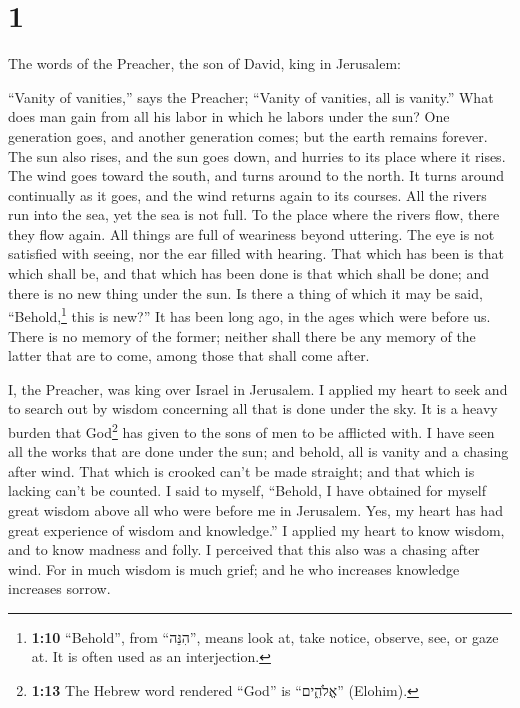\hypertarget{section}{%
\section{1}\label{section}}

 The words of the Preacher, the son of David, king in
Jerusalem:

 ``Vanity of vanities,'' says the Preacher; ``Vanity of
vanities, all is vanity.''  What does man gain from all
his labor in which he labors under the sun?  One
generation goes, and another generation comes; but the earth remains
forever.  The sun also rises, and the sun goes down, and
hurries to its place where it rises.  The wind goes toward
the south, and turns around to the north. It turns around continually as
it goes, and the wind returns again to its courses.  All
the rivers run into the sea, yet the sea is not full. To the place where
the rivers flow, there they flow again.  All things are
full of weariness beyond uttering. The eye is not satisfied with seeing,
nor the ear filled with hearing.  That which has been is
that which shall be, and that which has been done is that which shall be
done; and there is no new thing under the sun.  Is there
a thing of which it may be said, ``Behold,\footnote{\textbf{1:10}
  ``Behold'', from ``הִנֵּה'', means look at, take notice, observe, see,
  or gaze at. It is often used as an interjection.} this is new?'' It
has been long ago, in the ages which were before us. 
There is no memory of the former; neither shall there be any memory of
the latter that are to come, among those that shall come after.

 I, the Preacher, was king over Israel in Jerusalem.
 I applied my heart to seek and to search out by wisdom
concerning all that is done under the sky. It is a heavy burden that
God\footnote{\textbf{1:13} The Hebrew word rendered ``God'' is
  ``אֱלֹהִ֑ים'' (Elohim).} has given to the sons of men to be afflicted
with.  I have seen all the works that are done under the
sun; and behold, all is vanity and a chasing after wind. 
That which is crooked can't be made straight; and that which is lacking
can't be counted.  I said to myself, ``Behold, I have
obtained for myself great wisdom above all who were before me in
Jerusalem. Yes, my heart has had great experience of wisdom and
knowledge.''  I applied my heart to know wisdom, and to
know madness and folly. I perceived that this also was a chasing after
wind.  For in much wisdom is much grief; and he who
increases knowledge increases sorrow.

